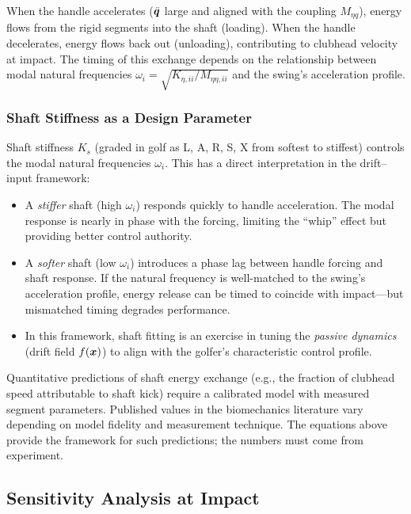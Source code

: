 When the handle accelerates ($\ddot{\bm{q}}$ large and aligned with the coupling $M_{\eta q}$),
energy flows from the rigid segments into the shaft (loading). When the handle decelerates,
energy flows back out (unloading), contributing to clubhead velocity at impact. The
timing of this exchange depends on the relationship between modal natural frequencies
$\omega_i = \sqrt{K_{\eta,ii} / M_{\eta\eta,ii}}$ and the swing's acceleration profile.

\subsubsection{Shaft Stiffness as a Design Parameter}

Shaft stiffness $K_s$ (graded in golf as L, A, R, S, X from softest to stiffest)
controls the modal natural frequencies $\omega_i$. This has a direct interpretation
in the drift--input framework:

\begin{itemize}
\item A \emph{stiffer} shaft (high $\omega_i$) responds quickly to handle acceleration.
      The modal response is nearly in phase with the forcing, limiting the ``whip'' effect
      but providing better control authority.
\item A \emph{softer} shaft (low $\omega_i$) introduces a phase lag between handle forcing
      and shaft response. If the natural frequency is well-matched to the swing's
      acceleration profile, energy release can be timed to coincide with impact---but
      mismatched timing degrades performance.
\item In this framework, shaft fitting is an exercise in tuning the \emph{passive dynamics}
      (drift field $f(\bm{x})$) to align with the golfer's characteristic control profile.
\end{itemize}

\begin{warningbox}
Quantitative predictions of shaft energy exchange (e.g., the fraction of clubhead
speed attributable to shaft kick) require a calibrated model with measured segment
parameters. Published values in the biomechanics literature vary depending on model
fidelity and measurement technique. The equations above provide the framework for
such predictions; the numbers must come from experiment.
\end{warningbox}

\subsection{Sensitivity Analysis at Impact}

